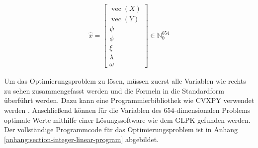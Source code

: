 \begin{figure}
    \centering
    \vspace*{-1.5cm}
    \begin{align*}
        \hat{x} = \begin{bmatrix}
                      \operatorname{vec}\left(X\right) \\[2pt]
                      \operatorname{vec}\left(Y\right) \\[2pt]
                      \psi                             \\[2pt]
                      \phi                             \\[2pt]
                      \xi                              \\[2pt]
                      \lambda                          \\[2pt]
                      \omega
                  \end{bmatrix} \in \mathbb{N}_0^{654}
    \end{align*}
    \vspace*{-1.25cm}
\end{figure}

Um das Optimierungsproblem zu lösen, müssen zuerst alle Variablen wie rechts zu sehen zusammengefasst werden und die Formeln in die Standardform überführt werden. Dazu kann eine Programmierbibliothek wie CVXPY verwendet werden \cite{2016.CVXPY} \cite{2018.CVXPYRewrite}. Anschließend können für die Variablen des $654$-dimensionalen Problems optimale Werte mithilfe einer Lösungssoftware wie dem \ac{GLPK} gefunden werden. Der vollständige Programmcode für das Optimierungsproblem ist in Anhang \ref{anhang:section-integer-linear-program} abgebildet.

\renewcommand{\arraystretch}{1}

